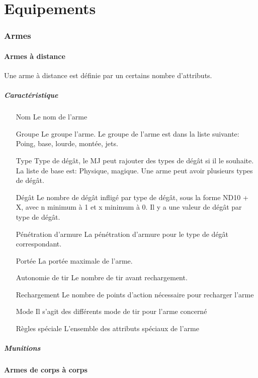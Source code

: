 \part{Equipements}

\section{Armes}
\subsection{Armes à distance}
Une arme à distance est définie par un certains nombre d'attributs.
\subsubsection{Caractéristique}

\begin{itemize}
\item[Nom] Le nom de l'arme
\item[Groupe]Le groupe l'arme. Le groupe de l'arme est dans la liste suivante: Poing, base, lourde, montée, jets.
\item[Type] Type de dégât, le MJ peut rajouter des types de dégât si il le souhaite. La liste de base est: Physique, magique. Une arme peut avoir plusieurs types de dégât.
\item[Dégât] Le nombre de dégât infligé par type de dégât, sous la forme ND10 + X, avec n minimum à 1 et x minimum à 0. Il y a une valeur de dégât par type de dégât. 
\item[Pénétration d'armure] La pénétration d'armure pour le type de dégât correspondant. 
\item[Portée] La portée maximale de l'arme.
\item[Autonomie de tir] Le nombre de tir avant rechargement.
\item[Rechargement] Le nombre de points d'action nécessaire pour recharger l'arme
\item[Mode] Il s'agit des différents mode de tir pour l'arme concerné
\item[Règles spéciale] L'ensemble des attributs spéciaux de l'arme
\end{itemize}
\subsubsection{Munitions}

\subsection{Armes de corps à corps}

